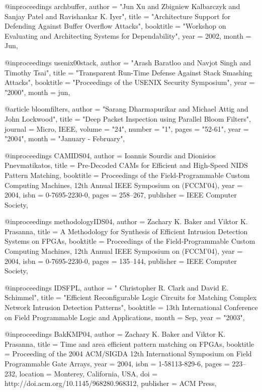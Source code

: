 @inproceedings{ archbuffer, 
	author = "Jun Xu and Zbigniew Kalbarczyk and Sanjay Patel and Ravishankar K. Iyer",
        title = "Architecture Support for Defending Against Buffer Overflow Attacks",  
        booktitle = "Workshop on Evaluating and Architecting Systems for Dependability",
	year = 2002,
	month = Jun,
}


@inproceedings{ usenix00stack,
    author = "Arash Baratloo and Navjot Singh and Timothy Tsai",
    title = "Transparent Run-Time Defense Against Stack Smashing Attacks",
    booktitle = "Proceedings of the USENIX Security Symposium",
    year = "2000",
    month = jun,
}


@article { bloomfilters,
    author = "Sarang Dharmapurikar and Michael Attig and John Lockwood",
    title = "Deep Packet Inspection using Parallel Bloom Filters",
    journal = {Micro, IEEE},
    volume =  "24",
    number = "1",
    pages = "52-61",
    year = "2004",
    month = "January - February",
}


@inproceedings{ CAMIDS04,
 author = {Ioannis Sourdis and Dionisios Pnevmatikatos},
 title = {Pre-Decoded {CAM}s for Efficient and High-Speed {NIDS} Pattern Matching},
 booktitle = {Proceedings of the Field-Programmable Custom Computing Machines, 12th Annual IEEE Symposium on (FCCM'04)},
 year = {2004},
 isbn = {0-7695-2230-0},
 pages = {258--267},
 publisher = {IEEE Computer Society},
 }


@inproceedings{ methodologyIDS04,
 author = {Zachary K. Baker and Viktor K. Prasanna},
 title = {A Methodology for Synthesis of Efficient Intrusion Detection Systems on {FPGA}s},
 booktitle = {Proceedings of the Field-Programmable Custom Computing Machines, 12th Annual IEEE Symposium on (FCCM'04)},
 year = {2004},
 isbn = {0-7695-2230-0},
 pages = {135--144},
 publisher = {IEEE Computer Society},
 }



@inproceedings{ IDSFPL,
    author = " Christopher R. Clark and David E. Schimmel",
    title = "Efficient Reconfigurable Logic Circuits for Matching Complex Network Intrusion Detection Patterns",
    booktitle = {13th International Conference on Field Programmable Logic and Applications},
    month = Sep,
    year = "2003",
}


@inproceedings{ BakKMP04,
 author = {Zachary K. Baker and Viktor K. Prasanna},
 title = {Time and area efficient pattern matching on {FPGA}s},
 booktitle = {Proceeding of the 2004 ACM/SIGDA 12th International Symposium on Field Programmable Gate Arrays},
 year = {2004},
 isbn = {1-58113-829-6},
 pages = {223--232},
 location = {Monterey, California, USA},
 doi = {http://doi.acm.org/10.1145/968280.968312},
 publisher = {ACM Press},
 }


